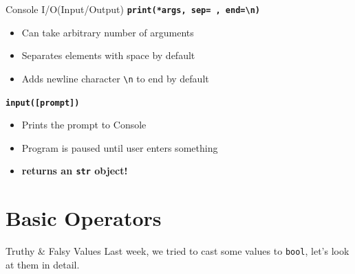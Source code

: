         \begin{frame}{Console I/O(Input/Output)}
            \huge
            \textbf{\texttt{print(*args, sep=\textquotesingle \ \textquotesingle, end=\textquotesingle \textbackslash n\textquotesingle )}}
            \begin{itemize}
                \LARGE
                \item Can take arbitrary number of arguments
                \item Separates elements with space by default
                \item Adds newline character \texttt{\textquotesingle \textbackslash n\textquotesingle} to end by default
            \end{itemize}
            
            \textbf{\texttt{input([prompt])}}
            \begin{itemize}
                \LARGE
                \item Prints the prompt to Console
                \item Program is paused until user enters something
                \item \textbf{returns an \texttt{str} object!} 
            \end{itemize}
        \end{frame}

    \section{Basic Operators}
        \begin{frame}{Truthy \& Falsy Values}
            \LARGE
            Last week, we tried to cast some values to \texttt{bool}, let's look at them in detail.
            \pause
            \begin{columns}
                    \inputminted[firstline=1, lastline=8, frame=single,framesep=2pt]{python3}{code-examples/truthy-falsy.py}
                \pause
                    \inputminted[firstline=9, lastline=16, frame=single,framesep=2pt]{python3}{code-examples/truthy-falsy.py}
            \end{columns}
        \end{frame}

